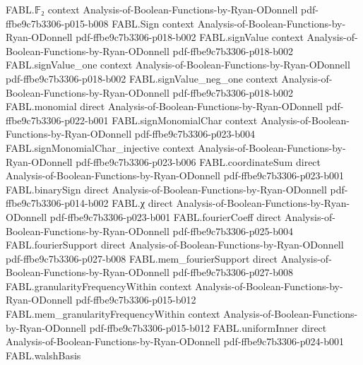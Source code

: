 \begin{theorem}
\label{FABL.subspaceCharacterSum_eq_card_of_mem}
\leanok
{}
\proofstep
  {FABL.𝔽₂}
  {context}
  {Analysis-of-Boolean-Functions-by-Ryan-ODonnell}
  {pdf-ffbe9c7b3306-p015-b008}
\proofstep
  {FABL.Sign}
  {context}
  {Analysis-of-Boolean-Functions-by-Ryan-ODonnell}
  {pdf-ffbe9c7b3306-p018-b002}
\proofstep
  {FABL.signValue}
  {context}
  {Analysis-of-Boolean-Functions-by-Ryan-ODonnell}
  {pdf-ffbe9c7b3306-p018-b002}
\proofstep
  {FABL.signValue_one}
  {context}
  {Analysis-of-Boolean-Functions-by-Ryan-ODonnell}
  {pdf-ffbe9c7b3306-p018-b002}
\proofstep
  {FABL.signValue_neg_one}
  {context}
  {Analysis-of-Boolean-Functions-by-Ryan-ODonnell}
  {pdf-ffbe9c7b3306-p018-b002}
\proofstep
  {FABL.monomial}
  {direct}
  {Analysis-of-Boolean-Functions-by-Ryan-ODonnell}
  {pdf-ffbe9c7b3306-p022-b001}
\proofstep
  {FABL.signMonomialChar}
  {context}
  {Analysis-of-Boolean-Functions-by-Ryan-ODonnell}
  {pdf-ffbe9c7b3306-p023-b004}
\proofstep
  {FABL.signMonomialChar_injective}
  {context}
  {Analysis-of-Boolean-Functions-by-Ryan-ODonnell}
  {pdf-ffbe9c7b3306-p023-b006}
\proofstep
  {FABL.coordinateSum}
  {direct}
  {Analysis-of-Boolean-Functions-by-Ryan-ODonnell}
  {pdf-ffbe9c7b3306-p023-b001}
\proofstep
  {FABL.binarySign}
  {direct}
  {Analysis-of-Boolean-Functions-by-Ryan-ODonnell}
  {pdf-ffbe9c7b3306-p014-b002}
\proofstep
  {FABL.χ}
  {direct}
  {Analysis-of-Boolean-Functions-by-Ryan-ODonnell}
  {pdf-ffbe9c7b3306-p023-b001}
\proofstep
  {FABL.fourierCoeff}
  {direct}
  {Analysis-of-Boolean-Functions-by-Ryan-ODonnell}
  {pdf-ffbe9c7b3306-p025-b004}
\proofstep
  {FABL.fourierSupport}
  {direct}
  {Analysis-of-Boolean-Functions-by-Ryan-ODonnell}
  {pdf-ffbe9c7b3306-p027-b008}
\proofstep
  {FABL.mem_fourierSupport}
  {direct}
  {Analysis-of-Boolean-Functions-by-Ryan-ODonnell}
  {pdf-ffbe9c7b3306-p027-b008}
\proofstep
  {FABL.granularityFrequencyWithin}
  {context}
  {Analysis-of-Boolean-Functions-by-Ryan-ODonnell}
  {pdf-ffbe9c7b3306-p015-b012}
\proofstep
  {FABL.mem_granularityFrequencyWithin}
  {context}
  {Analysis-of-Boolean-Functions-by-Ryan-ODonnell}
  {pdf-ffbe9c7b3306-p015-b012}
\proofstep
  {FABL.uniformInner}
  {direct}
  {Analysis-of-Boolean-Functions-by-Ryan-ODonnell}
  {pdf-ffbe9c7b3306-p024-b001}
\proofstep
  {FABL.walshBasis}

\end{theorem}
